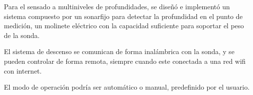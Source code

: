 Para el sensado a multiniveles de profundidades, se diseñó e implementó un sistema compuesto por un sonarfijo para detectar la profundidad en el punto de medición, un molinete eléctrico con la capacidad suficiente para soportar el peso de la sonda.

El sistema de descenso se comunican de forma inalámbrica con la sonda, y se pueden controlar de forma remota, siempre cuando este conectada a una red wifi con internet.

El modo de operación podría ser automático o manual, predefinido por el usuario.




